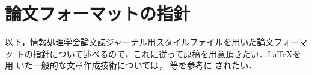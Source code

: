 



\section{論文フォーマットの指針}
\label{sec:format}

以下，情報処理学会論文誌ジャーナル用スタイルファイルを用いた論文フォーマッ
トの指針について述べるので，これに従って原稿を用意頂きたい．\LaTeX を用
いた一般的な文章作成技術については，\cite{okumura, companion} 等を参考に
されたい．
